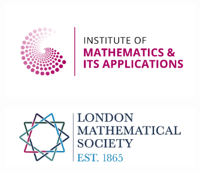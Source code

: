 \documentclass[
  letterpaper,
  DIV=11,
  numbers=noendperiod]{scrartcl}
\begin{document}
\begin{figure}

\begin{minipage}[t]{0.50\linewidth}

{\centering 

\includegraphics[width=0.75\textwidth,height=\textheight]{./images/IMA_logo.png}\\

}

\end{minipage}%
%
\begin{minipage}[t]{0.50\linewidth}

{\centering 

\includegraphics[width=0.75\textwidth,height=\textheight]{./images/LMS_logo.png}\\

}

\end{minipage}%

\end{figure}
\end{document}
